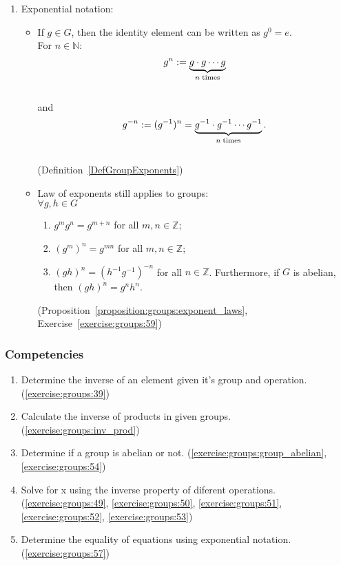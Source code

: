 \begin{enumerate}
\item
Exponential notation:
	\begin{itemize}
	\item
	If $g \in G$, then the identity element can be written as $g^0 = e$.\\
	For $n \in {\mathbb N}$:\\
	\[  	g^n := \underbrace{g \cdot g \cdots g}_{n \; {\rm times}} \]\\
	and\\
	\[g^{-n} := (g^{-1})^n =  \underbrace{g^{-1} \cdot g^{-1} \cdots g^{-1}}_{n \; {\rm times}}. \]\\
	(Definition~\ref{DefGroupExponents})
	
	\item
	Law of exponents still applies to groups:\\
	$\forall g, h \in G$\\
		\begin{enumerate}
 		\item
		$g^mg^n = g^{m+n}$ for all $m, n \in {\mathbb Z}$; 
 
		\item
		$(g^m)^n = g^{mn}$ for all $m, n \in {\mathbb Z}$; 
 
		\item
		$(gh)^n = (h^{-1}g^{-1})^{-n}$ for all $n \in {\mathbb Z}$. Furthermore, if $G$ is abelian, then $(gh)^n = g^nh^n$. 
 		\end{enumerate}
	(Proposition~\ref{proposition:groups:exponent_laws}, Exercise~\ref{exercise:groups:59})
	\end{itemize}
\end{enumerate}

\subsubsection*{Competencies}
\begin{enumerate}
\item
Determine the inverse of an element given it's group and operation. (\ref{exercise:groups:39})

\item
Calculate the inverse of products in given groups. (\ref{exercise:groups:inv_prod})

\item
Determine if a group is abelian or not. (\ref{exercise:groups:group_abelian}, \ref{exercise:groups:54})

\item
Solve for x using the inverse property of diferent operations. (\ref{exercise:groups:49}, \ref{exercise:groups:50}, \ref{exercise:groups:51}, \ref{exercise:groups:52}, \ref{exercise:groups:53})

\item
Determine the equality of equations using exponential notation. (\ref{exercise:groups:57})
\end{enumerate}


